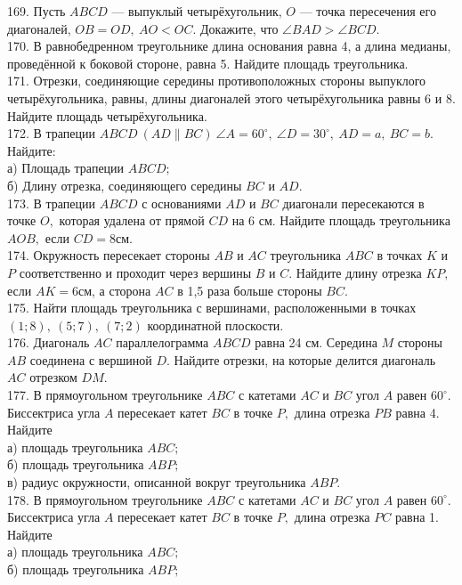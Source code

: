 169. Пусть $ABCD$ --- выпуклый четырёхугольник, $O$ --- точка пересечения его диагоналей, $OB=OD,\ AO<OC.$ Докажите, что $\angle BAD > \angle BCD.$\\
170. В равнобедренном треугольнике длина основания равна 4, а длина медианы, проведённой к боковой стороне, равна 5. Найдите площадь треугольника.\\
171. Отрезки, соединяющие середины противоположных стороны выпуклого четырёхугольника, равны, длины диагоналей этого четырёхугольника равны 6 и 8. Найдите площадь четырёхугольника.\\
172. В трапеции $ABCD\ (AD\parallel BC)\ \angle A=60^\circ,\ \angle D=30^\circ,\ AD=a,\ BC=b.$ Найдите:\\
а) Площадь трапеции $ABCD;$\\
б) Длину отрезка, соединяющего середины $BC$ и $AD.$\\
173. В трапеции $ABCD$ с основаниями $AD$ и $BC$ диагонали пересекаются в точке $O,$ которая удалена от прямой $CD$ на 6 см. Найдите площадь треугольника $AOB,$ если $CD=8$см.\\
174. Окружность пересекает стороны $AB$ и $AC$ треугольника $ABC$ в точках $K$ и $P$ соответственно и проходит через вершины $B$ и $C.$ Найдите длину отрезка $KP,$ если $AK=6$см, а сторона $AC$ в 1,5 раза больше стороны $BC.$\\
175. Найти площадь треугольника с вершинами, расположенными в точках $(1;8),\ (5;7),\ (7;2)$ координатной плоскости.\\
176. Диагональ $AC$ параллелограмма $ABCD$ равна 24 см. Середина $M$ стороны $AB$ соединена с вершиной $D.$ Найдите отрезки, на которые делится диагональ $AC$ отрезком $DM.$\\
177. В прямоугольном треугольнике $ABC$ с катетами $AC$ и $BC$ угол $A$ равен $60^\circ.$ Биссектриса угла $A$ пересекает катет $BC$ в точке $P,$ длина отрезка $PB$ равна 4. Найдите\\
а) площадь треугольника $ABC;$\\
б) площадь треугольника $ABP;$\\
в) радиус окружности, описанной вокруг треугольника $ABP.$\\
178. В прямоугольном треугольнике $ABC$ с катетами $AC$ и $BC$ угол $A$ равен $60^\circ.$ Биссектриса угла $A$ пересекает катет $BC$ в точке $P,$ длина отрезка $PC$ равна 1. Найдите\\
а) площадь треугольника $ABC;$\\
б) площадь треугольника $ABP;$\\
